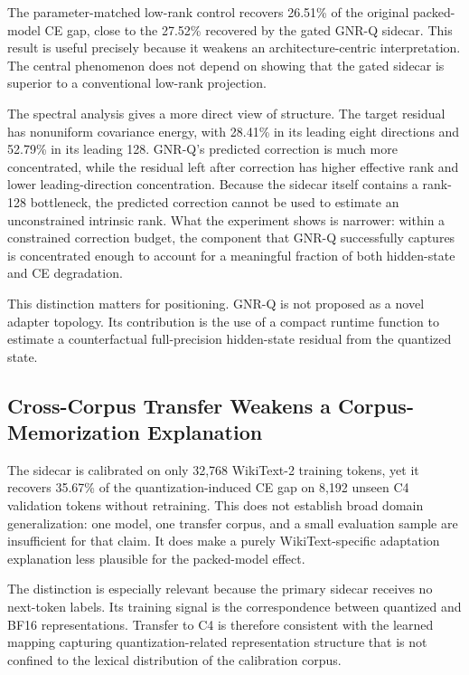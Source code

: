 \documentclass[11pt]{article}
\begin{document}
The parameter-matched low-rank control recovers 26.51\% of the original packed-model CE gap, close to the 27.52\% recovered by the gated GNR-Q sidecar. This result is useful precisely because it weakens an architecture-centric interpretation. The central phenomenon does not depend on showing that the gated sidecar is superior to a conventional low-rank projection.

The spectral analysis gives a more direct view of structure. The target residual has nonuniform covariance energy, with 28.41\% in its leading eight directions and 52.79\% in its leading 128. GNR-Q's predicted correction is much more concentrated, while the residual left after correction has higher effective rank and lower leading-direction concentration. Because the sidecar itself contains a rank-128 bottleneck, the predicted correction cannot be used to estimate an unconstrained intrinsic rank. What the experiment shows is narrower: within a constrained correction budget, the component that GNR-Q successfully captures is concentrated enough to account for a meaningful fraction of both hidden-state and CE degradation.

This distinction matters for positioning. GNR-Q is not proposed as a novel adapter topology. Its contribution is the use of a compact runtime function to estimate a counterfactual full-precision hidden-state residual from the quantized state.

\subsection{Cross-Corpus Transfer Weakens a Corpus-Memorization Explanation}

The sidecar is calibrated on only 32,768 WikiText-2 training tokens, yet it recovers 35.67\% of the quantization-induced CE gap on 8,192 unseen C4 validation tokens without retraining. This does not establish broad domain generalization: one model, one transfer corpus, and a small evaluation sample are insufficient for that claim. It does make a purely WikiText-specific adaptation explanation less plausible for the packed-model effect.

The distinction is especially relevant because the primary sidecar receives no next-token labels. Its training signal is the correspondence between quantized and BF16 representations. Transfer to C4 is therefore consistent with the learned mapping capturing quantization-related representation structure that is not confined to the lexical distribution of the calibration corpus.
\end{document}
